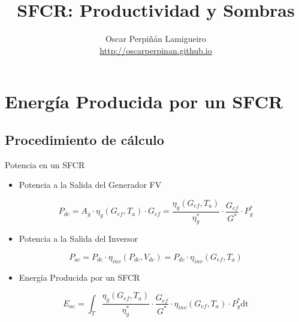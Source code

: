 \documentclass[xcolor={usenames,svgnames,dvipsnames}]{beamer}
\author{Oscar Perpiñán Lamigueiro \\ \url{http://oscarperpinan.github.io}}
\date{}
\title{SFCR: Productividad y Sombras}
\begin{document}
\maketitle

\section{Energía Producida por un SFCR}
\label{sec:org863409c}

\subsection{Procedimiento de cálculo}
\label{sec:orge6ea764}

\begin{frame}[label={sec:orga8f099c}]{Potencia en un SFCR}
\begin{itemize}
\item Potencia a la Salida del Generador FV
\end{itemize}

$$P_{dc} = A_g \cdot \eta_g(G_{ef}, T_a) \cdot  G_{ef} = %
      \frac{\eta_g(G_{ef}, T_a)}{\eta_g^*} \cdot \frac{G_{ef}}{G^*} \cdot P_g^*$$

\begin{itemize}
\item Potencia a la Salida del Inversor
\end{itemize}

$$P_{ac} = P_{dc} \cdot \eta_{inv}(P_{dc}, V_{dc}) =  P_{dc} \cdot \eta_{inv}(G_{ef}, T_a)$$

\begin{itemize}
\item Energía Producida por un SFCR
\end{itemize}

$$E_{ac} = \int_T \frac{\eta_g(G_{ef}, T_a)}{\eta_g^*} \cdot
      \frac{G_{ef}}{G^*} \cdot \eta_{inv}(G_{ef}, T_a) \cdot P_g^* \mathrm{dt}$$
\end{frame}
\end{document}
